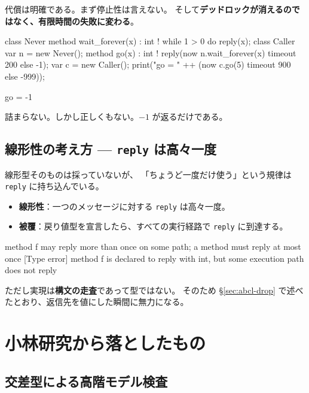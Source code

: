 \documentclass[11pt,a4paper]{ltjsarticle}
\theoremstyle{definition}
\theoremstyle{remark}
\begin{document}
代償は明確である。まず停止性は言えない。
そして\textbf{デッドロックが消えるのではなく、有限時間の失敗に変わる}。

\begin{aipl}
class Never  { method wait_forever(x) : int !{} { while 1 > 0 do { } reply(x); } }
class Caller {
  var n = new Never();
  method go(x) : int !{} { reply(now n.wait_forever(x) timeout 200 else -1); }
}
var c = new Caller();
print("go = " ++ (now c.go(5) timeout 900 else -999));
\end{aipl}
\begin{term}
go = -1
\end{term}

詰まらない。しかし正しくもない。$-1$ が返るだけである。

\subsection{線形性の考え方 --- \texttt{reply} は高々一度}

線形型そのものは採っていないが、
「ちょうど一度だけ使う」という規律は \texttt{reply} に持ち込んでいる。

\begin{itemize}
\item \textbf{線形性}：一つのメッセージに対する \texttt{reply} は高々一度。
\item \textbf{被覆}：戻り値型を宣言したら、すべての実行経路で \texttt{reply} に到達する。
\end{itemize}

\begin{term}
 method f may reply more than once on some path;
             a method must reply at most once
[Type error] method f is declared to reply with int,
             but some execution path does not reply
\end{term}

ただし実現は\textbf{構文の走査}であって型ではない。
そのため \S\ref{sec:abcl-drop} で述べたとおり、返信先を値にした瞬間に無力になる。

\section{小林研究から落としたもの}
\label{sec:koba-drop}

\subsection{交差型による高階モデル検査}
\end{document}
